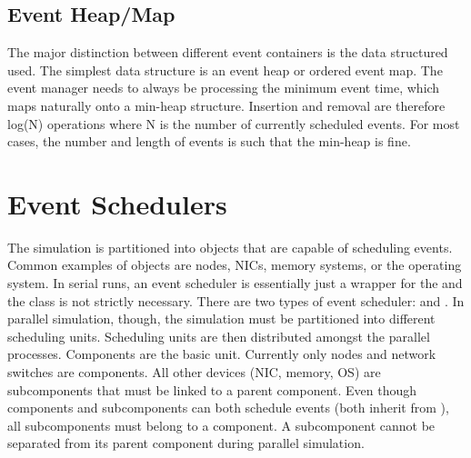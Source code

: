 \subsection{Event Heap/Map}
The major distinction between different event containers is the data structured used.
The simplest data structure is an event heap or ordered event map.
The event manager needs to always be processing the minimum event time, which maps naturally onto a min-heap structure.
Insertion and removal are therefore log(N) operations where N is the number of currently scheduled events.
For most cases, the number and length of events is such that the min-heap is fine.

\section{Event Schedulers}
The simulation is partitioned into objects that are capable of scheduling events.
Common examples of \evscheduler objects are nodes, NICs, memory systems, or the operating system.
In serial runs, an event scheduler is essentially just a wrapper for the \evmgr and the class is not strictly necessary.
There are two types of event scheduler:  and .
In parallel simulation, though, the simulation must be partitioned into different scheduling units.
Scheduling units are then distributed amongst the parallel processes.
Components are the basic unit.  Currently only nodes and network switches are components.
All other devices (NIC, memory, OS) are subcomponents that must be linked to a parent component.
Even though components and subcomponents can both schedule events (both inherit from \evscheduler),
all subcomponents must belong to a component.  A subcomponent cannot be separated from its parent component during parallel simulation.



